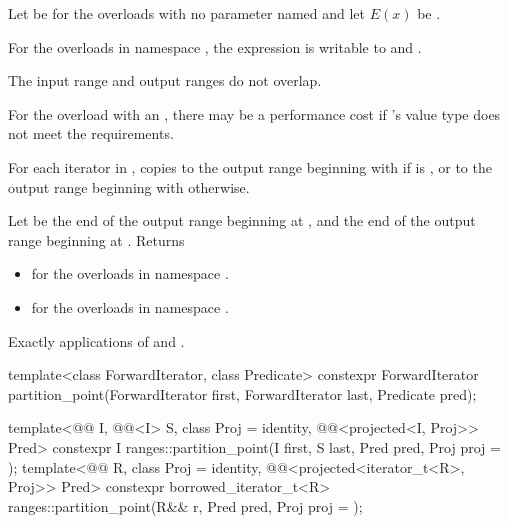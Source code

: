 \begin{itemdescr}
\pnum
Let  be 
for the overloads with no parameter named  and
let $E(x)$ be .

\pnum
\mandates
For the overloads in namespace ,
the expression 
is writable
to  and .

\pnum
\expects
The input range and output ranges do not overlap.

\begin{note}
For the overload with an ,
there may be a performance cost if 's value type
does not meet the  requirements.
\end{note}

\pnum
\effects
For each iterator  in ,
copies  to the output range beginning with 
if  is , or
to the output range beginning with  otherwise.

\pnum
\returns
Let  be the end of the output range beginning at ,
and  the end of the output range beginning at .
Returns
\begin{itemize}
\item {} for the overloads in namespace .
\item {} for the overloads in namespace .
\end{itemize}

\pnum
\complexity
Exactly  applications of  and .
\end{itemdescr}

%
\begin{itemdecl}
template<class ForwardIterator, class Predicate>
  constexpr ForwardIterator
    partition_point(ForwardIterator first, ForwardIterator last, Predicate pred);

template<@@ I, @@<I> S, class Proj = identity,
         @@<projected<I, Proj>> Pred>
  constexpr I ranges::partition_point(I first, S last, Pred pred, Proj proj = {});
template<@@ R, class Proj = identity,
         @@<projected<iterator_t<R>, Proj>> Pred>
  constexpr borrowed_iterator_t<R>
    ranges::partition_point(R&& r, Pred pred, Proj proj = {});
\end{itemdecl}

